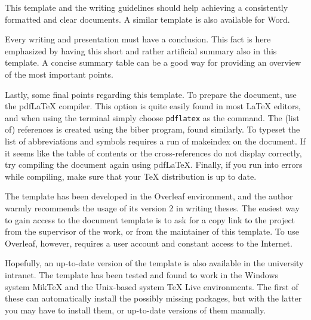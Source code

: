 This template and the writing guidelines should help achieving a consistently formatted and clear documents. A similar template is also available for Word.

Every writing and presentation must have a conclusion. This fact is here emphasized by having this short and rather artificial summary also in this template. A concise summary table can be a good way for providing an overview of the most important points.

Lastly, some final points regarding this template. To prepare the document, use the pdf\LaTeX{} compiler. This option is quite easily found in most \LaTeX{} editors, and when using the terminal simply choose \texttt{pdflatex} as the command. The (list of) references is created using the biber program, found similarly. To typeset the list of abbreviations and symbols requires a run of makeindex on the document. If it seems like the table of contents or the cross-references do not display correctly, try compiling the document again using pdf\LaTeX{}. Finally, if you run into errors while compiling, make sure that your \TeX{} distribution is up to date.

The template has been developed in the Overleaf environment, and the author warmly recommends the usage of its version 2 in writing theses. The easiest way to gain access to the document template is to ask for a copy link to the project from the supervisor of the work, or from the maintainer of this template. To use Overleaf, however, requires a user account and constant access to the Internet.

Hopefully, an up-to-date version of the template is also available in the university intranet. The template has been tested and found to work in the Windows system Mik\TeX{} and the Unix-based system \TeX{} Live environments. The first of these can automatically install the possibly missing packages, but with the latter you may have to install them, or up-to-date versions of them manually.

